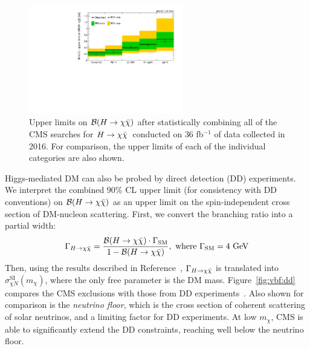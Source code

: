 \begin{figure}[]
    \begin{center}
        \includegraphics[width=0.6\textwidth]{figures/vbf/fits/comb.pdf}
        \caption{Upper limits on $\mathcal{B}(H\rightarrow\chi\bar\chi)$ after statistically combining all of the CMS searches for $H\rightarrow\chi\bar\chi$~conducted on $36$ fb$^{-1}$ of data collected in 2016.
                 For comparison, the upper limits of each of the individual categories are also shown.}
        \label{fig:vbf:comb}
    \end{center}
\end{figure}

Higgs-mediated DM can also be probed by direct detection (DD) experiments.
We interpret the combined 90\% CL upper limit (for consistency with DD conventions) on $\mathcal{B}(H\rightarrow\chi\bar\chi)$ as an upper limit on the spin-independent cross section of DM-nucleon scattering. 
First, we convert the branching ratio into a partial width:
\begin{equation}
    \Gamma_{H\rightarrow\chi\bar\chi} = \frac{\mathcal{B}(H\rightarrow\chi\bar\chi) \cdot \Gamma_\mathrm{SM}}{1 - \mathcal{B}(H\rightarrow\chi\bar\chi)}, \text{ where }\Gamma_\mathrm{SM} = 4~\mathrm{GeV}
\end{equation}
Then, using the results described in Reference~\needcite, $\Gamma_{H\rightarrow\chi\bar\chi}$ is translated into $\sigma^{\mathrm{SI}}_{\chi N}(m_\chi)$, where the only free parameter is the DM mass.
Figure~\ref{fig:vbf:dd} compares the CMS exclusions with those from DD experiments~\needcite.
Also shown for comparison is the \emph{neutrino floor}, which is the cross section of coherent scattering of solar neutrinos, and a limiting factor for DD experiments.
At low $m_\chi$, CMS is able to significantly extend the DD constraints, reaching well below the neutrino floor. 

